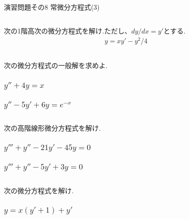 \documentclass[a4paper,11pt,fleqn]{jarticle}
\begin{document}
\begin{center}
\begin{Large}
演習問題その8  常微分方程式(3)
\end{Large}
\end{center}

\subsection{}
次の1階高次の微分方程式を解け.ただし、$dy/dx=y'$とする.
\begin{eqnarray*}
y=xy'-y^2/4
\end{eqnarray*}

\newpage
\subsection{}
次の微分方程式の一般解を求めよ.
\subsubsection{$y''+4y=x$}

\vspace{80mm}
\subsubsection{$y''-5y'+6y=e^{-x}$}

\newpage
\subsection{}
次の高階線形微分方程式を解け.
\subsubsection{$y'''+y''-21y'-45y=0$}

\vspace{80mm}
\subsubsection{$y'''+y''-5y'+3y=0$}

\newpage
\subsection{}
次の微分方程式を解け.
\subsubsection{$y=x(y'+1)+y'$}

\vspace{90mm}
\end{document}

